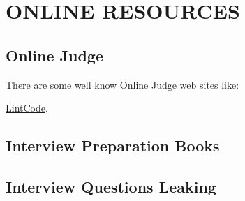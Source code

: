 \chapter{ONLINE RESOURCES}




\section{Online Judge }

There are some well know Online Judge web sites like:

 
\href{http://www.lintcode.com/en/problem/}{LintCode}. 

\section{Interview Preparation Books }

\section{Interview Questions Leaking}
 